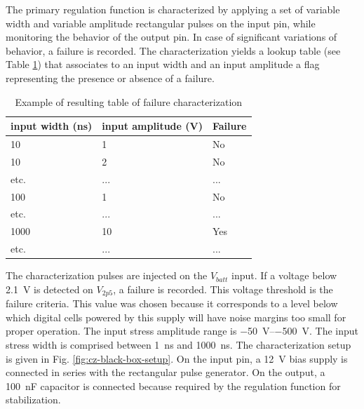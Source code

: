The primary regulation function is characterized by applying a set of variable width and variable amplitude rectangular pulses on the input pin, while monitoring the behavior of the output pin.
In case of significant variations of behavior, a failure is recorded.
The characterization yields a lookup table (see Table \ref{tab:cz-failure}) that associates to an input width and an input amplitude a flag representing the presence or absence of a failure.

\begin{table}[!h]
\centering
\begin{tabular}{@{}lll@{}}
\toprule
input width (ns) & input amplitude (V) & Failure   \\ \midrule
10               & 1                   & No        \\
10               & 2                   & No        \\
etc.             & ...                 & ...       \\
100              & 1                   & No        \\
etc.             & ...                 & ...       \\
1000             & 10                  & Yes       \\
etc.             & ...                 & ... \\ \bottomrule
\end{tabular}
\caption{Example of resulting table of failure characterization}
\label{tab:cz-failure}
\end{table}

The characterization pulses are injected on the $V_{batt}$ input.
If a voltage below \SI{2.1}{\volt} is detected on $V_{2p5}$, a failure is recorded.
This voltage threshold is the failure criteria.
This value was chosen because it corresponds to a level below which digital cells powered by this supply will have noise margins too small for proper operation.
The input stress amplitude range is \SIrange{-50}{-500}{\volt}.
The input stress width is comprised between \SI{1}{\nano\second} and \SI{1000}{\nano\second}.
The characterization setup is given in Fig. \ref{fig:cz-black-box-setup}.
On the input pin, a \SI{12}{\volt} bias supply is connected in series with the rectangular pulse generator.
On the output, a \SI{100}{\nano\farad} capacitor is connected because required by the regulation function for stabilization.


